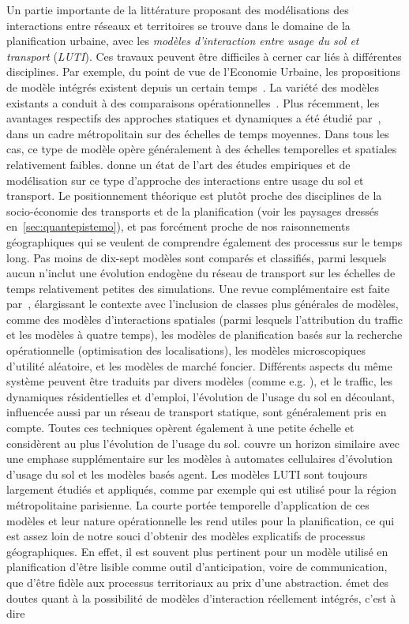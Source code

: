 {Un partie importante de la littérature proposant des modélisations des interactions entre réseaux et territoires se trouve dans le domaine de la planification urbaine, avec les \emph{modèles d'interaction entre usage du sol et transport} (\emph{LUTI}). Ces travaux peuvent être difficiles à cerner car liés à différentes disciplines. Par exemple, du point de vue de l'Economie Urbaine, les propositions de modèle intégrés existent depuis un certain temps~\cite{putman1975urban}. La variété des modèles existants a conduit à des comparaisons opérationnelles~\cite{paulley1991overview}. Plus récemment, les avantages respectifs des approches statiques et dynamiques a été étudié par~\cite{kryvobokov2013comparison}, dans un cadre métropolitain sur des échelles de temps moyennes. Dans tous les cas, ce type de modèle opère généralement à des échelles temporelles et spatiales relativement faibles. \cite{wegener2004land} donne un état de l'art des études empiriques et de modélisation sur ce type d'approche des interactions entre usage du sol et transport. Le positionnement théorique est plutôt proche des disciplines de la socio-économie des transports et de la planification (voir les paysages dressés en~\ref{sec:quantepistemo}), et pas forcément proche de nos raisonnements géographiques qui se veulent de comprendre également des processus sur le temps long. Pas moins de dix-sept modèles sont comparés et classifiés, parmi lesquels aucun n'inclut une évolution endogène du réseau de transport sur les échelles de temps relativement petites des simulations. Une revue complémentaire est faite par~\cite{chang2006models}, élargissant le contexte avec l'inclusion de classes plus générales de modèles, comme des modèles d'interactions spatiales (parmi lesquels l'attribution du traffic et les modèles à quatre temps), les modèles de planification basés sur la recherche opérationnelle (optimisation des localisations), les modèles microscopiques d'utilité aléatoire, et les modèles de marché foncier. Différents aspects du même système peuvent être traduits par divers modèles (comme e.g. \cite{wegener1991one}), et le traffic, les dynamiques résidentielles et d'emploi, l'évolution de l'usage du sol en découlant, influencée aussi par un réseau de transport statique, sont généralement pris en compte. Toutes ces techniques opèrent également à une petite échelle et considèrent au plus l'évolution de l'usage du sol. \cite{iacono2008models} couvre un horizon similaire avec une emphase supplémentaire sur les modèles à automates cellulaires d'évolution d'usage du sol et les modèles basés agent. Les modèles LUTI sont toujours largement étudiés et appliqués, comme par exemple \cite{delons:hal-00319087} qui est utilisé pour la région métropolitaine parisienne. La courte portée temporelle d'application de ces modèles et leur nature opérationnelle les rend utiles pour la planification, ce qui est assez loin de notre souci d'obtenir des modèles explicatifs de processus géographiques. En effet, il est souvent plus pertinent pour un modèle utilisé en planification d'être lisible comme outil d'anticipation, voire de communication, que d'être fidèle aux processus territoriaux au prix d'une abstraction. \cite{timmermans2003saga} émet des doutes quant à la possibilité de modèles d'interaction réellement intégrés, c'est à dire }
